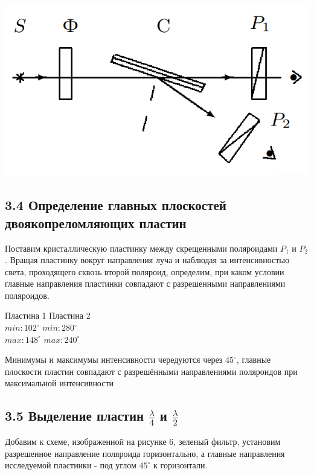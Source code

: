 \documentclass[a4paper,12pt]{report}
\begin{document}
\begin{center}
    \includegraphics[scale = 0.5]{2.png}
\end{center}

\subsection*{3.4 Определение главных плоскостей двоякопреломляющих пластин}

Поставим кристаллическую пластинку между скрещенными поляроидами $P_{1}$ и $P_{2}$. Вращая пластинку вокруг направления луча и наблюдая за интенсивностью света, проходящего сквозь второй поляроид, определим, при каком условии главные направления пластинки совпадают с разрешенными направлениями поляроидов.

\begin{center}
    Пластина 1 \hspace{1cm} Пластина 2 \\
    $min: 102^{\circ}$ \hspace {1cm} $min: 280^{\circ}$ \\
     $max: 148^{\circ}$ \hspace {1cm} $max: 240^{\circ}$
\end{center}
Минимумы и максимумы интенсивности чередуются через $45^{\circ}$, главные плоскости пластин совпадают с разрешёнными направлениями поляроидов при максимальной интенсивности


\subsection*{3.5 Выделение пластин $\frac{\lambda}{4}$ и $\frac{\lambda}{2}$}

Добавим к схеме, изображенной на рисунке 6, зеленый фильтр, установим разрешенное направление поляроида горизонтально, а главные направления исследуемой пластинки - под углом $45^{\circ}$ к горизонтали.
\end{document}
